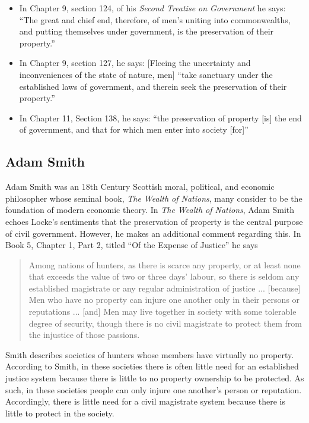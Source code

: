 \begin{itemize}
\item In Chapter 9, section 124, of his  \textit{Second Treatise on Government} he says:
``The great and chief end, therefore, of men's uniting into commonwealths, and putting themselves under government, is the preservation of their property.''
\item In Chapter 9, section 127, he says:
[Fleeing the uncertainty and inconveniences of the state of nature, men] ``take sanctuary under the established laws of government, and therein seek the preservation of their property.''
\item In Chapter 11, Section 138, he says:
``the preservation of property [is] the end of government, and that for which men enter into society [for]''
\end{itemize}


\subsection{Adam Smith}
Adam Smith was an 18th Century Scottish moral, political, and economic philosopher whose seminal book, \textit{The Wealth of Nations}, many consider to be the foundation of modern economic theory.  In \textit{The Wealth of Nations}, Adam Smith echoes Locke's sentiments that the preservation of property is the central purpose of civil government.
However, he makes an additional comment regarding this.  In Book 5, Chapter 1, Part 2, titled ``Of the Expense of Justice'' he says
\begin{quote}
Among nations of hunters, as there is scarce any property, or at least none that exceeds the value of two or three days' labour, so there is seldom any established magistrate or any regular administration of justice ... [because] Men who have no property can injure one another only in their persons or reputations ... [and] Men may live together in society with some tolerable degree of security, though there is no civil magistrate to protect them from the injustice of those passions. 
\end{quote}

Smith describes societies of hunters whose members have virtually no property.  According to Smith, in these societies there is often little need for an established justice system because there is little to no property ownership to be protected.  As such, in these societies people can only injure one another's person or reputation.
Accordingly, there is little need for a civil magistrate system because there is little to protect in the society.  


